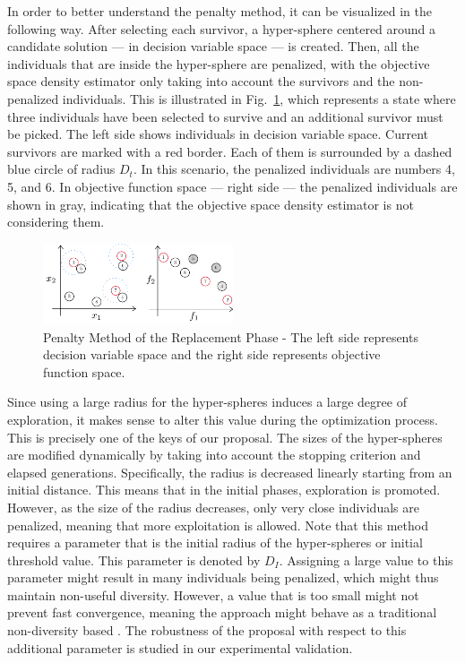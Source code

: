In order to better understand the penalty method, it can be visualized in the following way.
%
After selecting each survivor, a hyper-sphere 
centered around a candidate solution --- in decision variable space --- is created.
%
Then, all the individuals that are inside the hyper-sphere are penalized, with the objective space density estimator only taking 
into account the survivors and the non-penalized individuals.
%
This is illustrated in Fig.~\ref{fig:Hypersphere}, which represents a state where three individuals have been 
selected to survive and an additional survivor must be picked.
%
The left side shows individuals in decision variable space.
%
Current survivors are marked with a red border. Each of them is surrounded by a dashed blue circle of 
radius $D_t$.
%
In this scenario, the penalized individuals are numbers 4, 5, and 6.
%
In objective function space --- right side --- the penalized individuals are shown in gray, indicating
that the objective space density estimator is not considering them.
\begin{figure}[h]
\centering
\includegraphics[width=0.5\textwidth]{Images/Diagram.pdf}
\caption{Penalty Method of the Replacement Phase - The left side represents decision variable space and the right side represents 
objective function space.} \label{fig:Hypersphere}
\end{figure}

Since using a large radius for the hyper-spheres induces a large degree of 
exploration, it makes sense to alter this value during the optimization process.
%
This is precisely one of the keys of our proposal.
%
The sizes of the hyper-spheres are modified dynamically by taking into account the stopping 
criterion and elapsed generations.
%
Specifically, the radius is decreased linearly starting from an initial distance.
%
This means that in the initial phases, exploration is promoted.
%
However, as the size of the radius decreases, only very close individuals are penalized, meaning that more 
exploitation is allowed.
%
Note that this method requires a parameter that is the initial radius of the 
hyper-spheres or initial threshold value.
%
This parameter is denoted by $D_I$. 
%
Assigning a large value to this parameter might result in many individuals being penalized, which might thus maintain non-useful diversity.
%
However, a value that is too small might not prevent fast convergence, meaning the approach  
might behave as a traditional non-diversity based \MOEA{}.
%
The robustness of the proposal with respect to this additional parameter is studied in our experimental validation.

